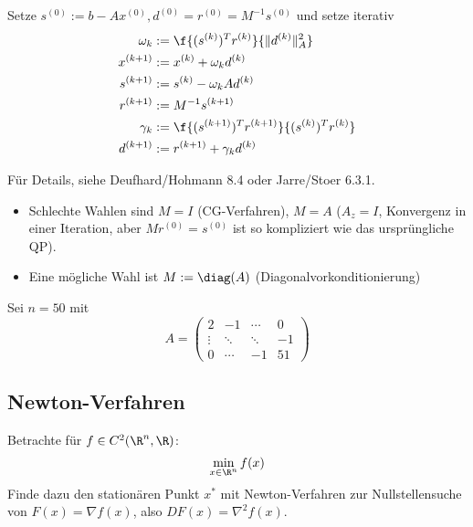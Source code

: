 \documentclass[11pt]{scrbook}
\begin{document}
\begin{df} \label{4.25}
	Setze $s^{(0)} := b - Ax^{(0)}, d^{(0)} = r^{(0)} = M^{-1}s^{(0)}$ und setze iterativ
	\begin{align*}
		\omega_k &:= \f {(s^{(k)})^T r^{(k)}}{\|d^{(k)}\|_A^2} \\
		x^{(k+1)} &:= x^{(k)} + \omega_k d^{(k)} \\
		s^{(k+1)} &:= s^{(k)} - \omega_k A d^{(k)} \\
		r^{(k+1)} &:= M^{-1}s^{(k+1)} \\
		\gamma_k &:= \f {(s^{(k+1)})^T r^{(k+1)}}{(s^{(k)})^T r^{(k)}} \\
		d^{(k+1)} &:= r^{(k+1)} + \gamma_k d^{(k)}
	\end{align*}
	\begin{note}
		Für Details, siehe Deufhard/Hohmann 8.4 oder Jarre/Stoer 6.3.1.
	\end{note}
	\begin{note}
		\begin{itemize}
			\item
				Schlechte Wahlen sind $M = I$ (CG-Verfahren), $M=A$ ($A_z = I$, Konvergenz in einer Iteration, aber $Mr^{(0)} = s^{(0)}$ ist so kompliziert wie das ursprüngliche QP).
			\item
				Eine mögliche Wahl ist $M := \diag(A)$ (Diagonalvorkonditionierung)
		\end{itemize}
	\end{note}
\end{df}

\begin{ex*}
	Sei $n = 50$ mit
	\[
		A = \begin{pmatrix}
			2 & - 1 & \cdots & 0 \\
			\vdots & \ddots & \ddots & -1 \\
			0 & \cdots & -1 & 51 
		\end{pmatrix}
	\]
\end{ex*}


\subsection{Newton-Verfahren}


Betrachte für $f \in C^2(\R^n, \R)$:
\[
	\min_{x \in \R^n} f(x)
\]
Finde dazu den stationären Punkt $x^*$ mit Newton-Verfahren zur Nullstellensuche von $F(x) = \nabla f(x)$, also $DF(x) = \nabla^2 f(x)$.
\end{document}
